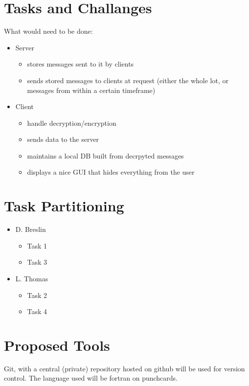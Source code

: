 \section{Tasks and Challanges}
What would need to be done:
\begin{itemize}
\item  Server
    \begin{itemize}
    \item stores messages sent to it by clients
    \item sends stored messages to clients at request (either the whole lot, or
    messages from within a certain timeframe)
    \end{itemize}
\item Client
    \begin{itemize}
    \item handle decryption/encryption
    \item sends data to the server
    \item maintains a local DB built from decrpyted messages
    \item displays a nice GUI that hides everything from the user
    \end{itemize}
\end{itemize}

\section{Task Partitioning}
\begin{itemize}
\item D. Breslin
    \begin{itemize}
    \item Task 1
    \item Task 3
    \end{itemize}
\item L. Thomas
    \begin{itemize}
    \item Task 2
    \item Task 4
    \end{itemize}
\end{itemize}

\section{Proposed Tools}
Git, with a central (private) repository hosted on github will be used for
version control. The language used will be fortran on punchcards.

